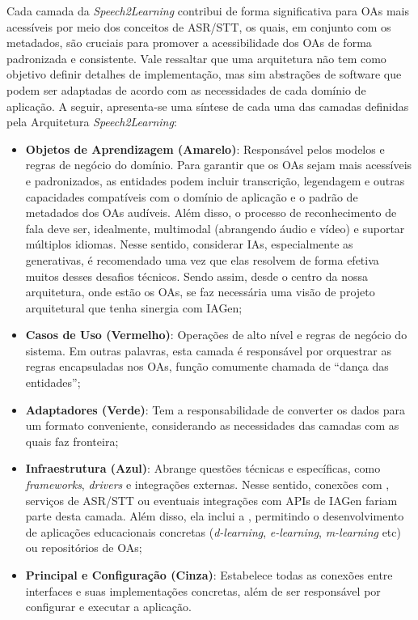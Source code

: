 Cada camada da \textit{Speech2Learning} contribui de forma significativa para OAs mais acessíveis por meio dos conceitos de ASR/STT, os quais, em conjunto com os metadados, são cruciais para promover a acessibilidade dos OAs de forma padronizada e consistente. Vale ressaltar que uma arquitetura não tem como objetivo definir detalhes de implementação, mas sim abstrações de software que podem ser adaptadas de acordo com as necessidades de cada domínio de aplicação. A seguir, apresenta-se uma síntese de cada uma das camadas definidas pela Arquitetura \textit{Speech2Learning}:

\begin{itemize}
\item \textbf{Objetos de Aprendizagem (Amarelo)}: Responsável pelos modelos e regras de negócio do domínio. Para garantir que os OAs sejam mais acessíveis e padronizados, as entidades podem incluir transcrição, legendagem e outras capacidades compatíveis com o domínio de aplicação e o padrão de metadados dos OAs audíveis. Além disso, o processo de reconhecimento de fala deve ser, idealmente, multimodal (abrangendo áudio e vídeo) e suportar múltiplos idiomas. Nesse sentido, considerar IAs, especialmente as generativas, é recomendado uma vez que elas resolvem de forma efetiva muitos desses desafios técnicos. Sendo assim, desde o centro da nossa arquitetura, onde estão os OAs, se faz necessária uma visão de projeto arquitetural que tenha sinergia com IAGen;
\item \textbf{Casos de Uso (Vermelho)}: Operações de alto nível e regras de negócio do sistema. Em outras palavras, esta camada é responsável por orquestrar as regras encapsuladas nos OAs, função comumente chamada de ``dança das entidades'';
\item \textbf{Adaptadores (Verde)}: Tem a responsabilidade de converter os dados para um formato conveniente, considerando as necessidades das camadas com as quais faz fronteira;
\item \textbf{Infraestrutura (Azul)}: Abrange questões técnicas e específicas, como \textit{frameworks}, \textit{drivers} e integrações externas. Nesse sentido, conexões com , serviços de ASR/STT ou eventuais integrações com APIs de IAGen fariam parte desta camada. Além disso, ela inclui a , permitindo o desenvolvimento de aplicações educacionais concretas (\textit{d-learning}, \textit{e-learning}, \textit{m-learning} etc) ou repositórios de OAs;
\item \textbf{Principal e Configuração (Cinza)}: Estabelece todas as conexões entre interfaces e suas implementações concretas, além de ser responsável por configurar e executar a aplicação.
\end{itemize}

